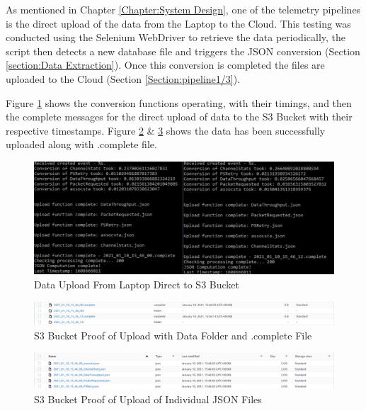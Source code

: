 As mentioned in Chapter \ref{Chapter:System Design}, one of the telemetry pipelines is the direct upload of the data from the Laptop to the Cloud. This testing was conducted using the Selenium WebDriver to retrieve the data periodically, the script then detects a new database file and triggers the JSON conversion (Section \ref{section:Data Extraction}). Once this conversion is completed the files are uploaded to the Cloud (Section \ref{Section:pipeline1/3}). 

Figure \ref{fig_uploadData} shows the conversion functions operating, with their timings, and then the complete messages for the direct upload of data to the S3 Bucket with their respective timestamps. Figure \ref{fig_s3Upload} \& \ref{fig_s3UploadFolder} shows the data has been successfully uploaded along with .complete file. 

\begin{figure} [ht]
    \centering
    \includegraphics[width=1\linewidth]{pages/Chapter5/Chapter 5 images/dataUpload.PNG}
    \caption{Data Upload From Laptop Direct to S3 Bucket}
    \label{fig_uploadData}
\end{figure}

\begin{figure} [ht]
    \centering
    \includegraphics[width=1\linewidth]{pages/Chapter5/Chapter 5 images/s3Upload.PNG}
    \caption{S3 Bucket Proof of Upload with Data Folder and .complete File}
    \label{fig_s3Upload}
\end{figure}

\begin{figure} [ht]
    \centering
    \includegraphics[width=1\linewidth]{pages/Chapter5/Chapter 5 images/s3UploadFolder.PNG}
    \caption{S3 Bucket Proof of Upload of Individual JSON Files}
    \label{fig_s3UploadFolder}
\end{figure}